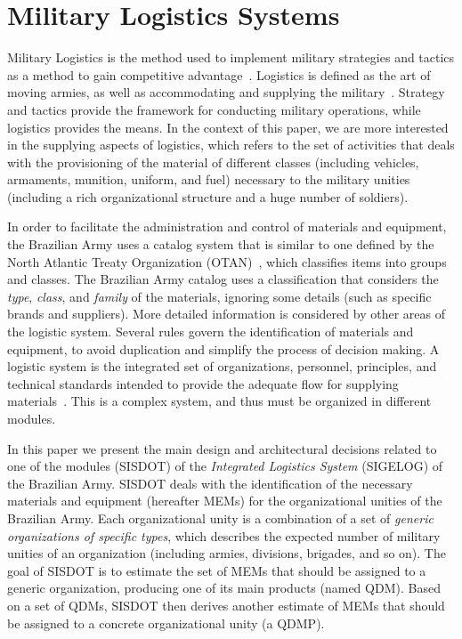 \section{Military Logistics Systems}
\label{sec:logistics}

Military Logistics is the method used to implement military strategies and tactics as a method to gain 
competitive advantage~\cite{rutner2012}. Logistics is defined as the art of moving armies, 
as well as accommodating and supplying the military~\cite{prebilic2006}. Strategy and tactics 
provide the framework for conducting military operations, while logistics provides the means.
In the context of this paper, we are more interested in the supplying aspects of logistics, which 
refers to the set of activities that deals with the  provisioning of 
the material of different classes (including vehicles, armaments, munition, uniform, and fuel) necessary to the 
military unities (including a rich organizational structure and a huge number of soldiers). 

In order to facilitate the administration and control of materials and equipment, the Brazilian Army uses a 
catalog system that is similar to one defined by the North Atlantic Treaty Organization (OTAN)~\cite{otan2012}, 
which classifies items into groups and classes. 
The Brazilian Army catalog uses a classification that considers the \emph{type}, \emph{class}, and \emph{family} of the 
materials, ignoring some details (such as specific brands and suppliers). More detailed information is considered by 
other areas of the logistic system. Several rules govern the identification of materials and equipment, 
to avoid duplication and simplify the process of decision making. A logistic system is the integrated set of organizations, 
personnel, principles, and technical standards intended to provide the adequate flow for supplying materials~\cite{brasil2003}. 
This is a complex system, and thus must be organized in different modules. 

In this paper we present the main design and architectural decisions related to one of the modules (SISDOT) of the \emph{Integrated 
Logistics System} (SIGELOG) of the Brazilian Army. SISDOT deals with the identification of the necessary 
materials and equipment (hereafter MEMs) for the organizational unities of the Brazilian Army. Each organizational 
unity is a combination of a set of \emph{generic organizations of specific types}, which describes the expected 
number of military unities of an organization (including armies, divisions, brigades, and so on). The goal of 
SISDOT is to estimate the set of MEMs that should be assigned to a generic organization, producing 
one of its main products (named QDM). Based on a set of QDMs, SISDOT then derives another estimate 
of MEMs that should be assigned to a concrete organizational unity (a QDMP). 

